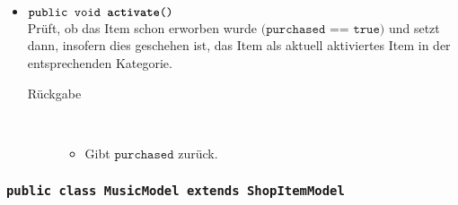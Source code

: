\begin{description}
\begin{itemize}
			
		\item $\texttt{public void \textbf{activate}()}$ \\ Prüft, ob das Item schon erworben wurde $\texttt{(purchased == true)}$ und setzt dann, insofern dies geschehen ist, das Item als aktuell aktiviertes Item in der entsprechenden Kategorie.
		\begin{description}
		\item[Rückgabe] \hfill \\
			\vspace{-.8cm}
			\begin{itemize}
				\item Gibt $\texttt{purchased}$ zurück.
			\end{itemize}

		\end{description}
	\end{itemize}
\end{description}


\subsubsection{\normalfont \texttt{public class \textbf{MusicModel} extends ShopItemModel}}


